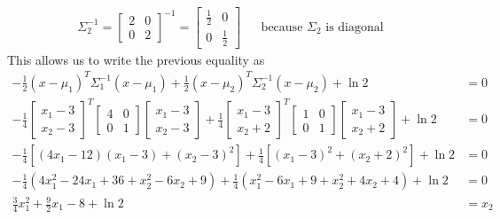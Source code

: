 \documentclass[a4paper, 10pt, twoside]{article}
\begin{document}
\begin{enumerate}[a)]
\begin{align}
              \Sigma_2^{-1} = \begin{bmatrix}2 & 0 \\ 0 & 2\end{bmatrix}^{-1} = \begin{bmatrix}\frac{1}{2} & 0 \\ 0 & \frac{1}{2}\end{bmatrix} &  & \text{because } \Sigma_2 \text{ is diagonal}
          \end{align}
          This allows us to write the previous equality as
          \begin{align*}
              - \frac{1}{2}(x-\mu_1)^T \Sigma_1^{-1}(x-\mu_1) + \frac{1}{2}(x-\mu_2)^T \Sigma_2^{-1}(x-\mu_2)  + \ln 2                                                                                              & = 0   \\
              - \frac{1}{4}\begin{bmatrix}x_1-3 \\ x_2-3\end{bmatrix}^T \begin{bmatrix}4 & 0 \\ 0 & 1\end{bmatrix}\begin{bmatrix}x_1-3 \\ x_2-3\end{bmatrix} + \frac{1}{4}\begin{bmatrix}x_1-3 \\ x_2+2\end{bmatrix}^T\begin{bmatrix}1 & 0 \\ 0 & 1\end{bmatrix}\begin{bmatrix}x_1-3 \\ x_2+2\end{bmatrix}  + \ln 2 & = 0   \\
              - \frac{1}{4}[(4x_1-12)(x_1-3)+(x_2-3)^2] + \frac{1}{4}[(x_1-3)^2+(x_2+2)^2] + \ln 2                                                                                                                  & = 0   \\
              -\frac{1}{4}(4x_1^2 -24x_1 + 36 + x_2^2 -6x_2+9) + \frac{1}{4}(x_1^2-6x_1+9+x_2^2+4x_2+4) + \ln 2                                                                                                     & = 0   \\
              \frac{3}{4}x_1^2 + \frac{9}{2}x_1 -8 + \ln 2                                                                                                                                                          & = x_2

\end{align*}
\end{enumerate}
\end{document}
